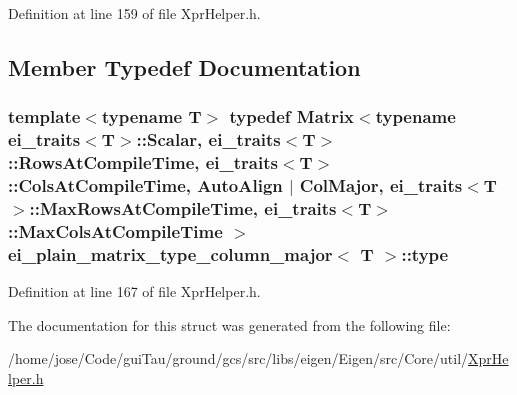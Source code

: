 Definition at line 159 of file Xpr\-Helper.\-h.



\subsection{Member Typedef Documentation}
\hypertarget{structei__plain__matrix__type__column__major_a038c0b348f1d8849036cbd2bfe8bba6b}{
\subsubsection[{type}]{\setlength{\rightskip}{0pt plus 5cm}template$<$typename T$>$ typedef {\bf Matrix}$<$typename {\bf ei\-\_\-traits}$<$T$>$\-::Scalar, {\bf ei\-\_\-traits}$<$T$>$\-::Rows\-At\-Compile\-Time, {\bf ei\-\_\-traits}$<$T$>$\-::Cols\-At\-Compile\-Time, {\bf Auto\-Align} $|$ {\bf Col\-Major}, {\bf ei\-\_\-traits}$<$T$>$\-::Max\-Rows\-At\-Compile\-Time, {\bf ei\-\_\-traits}$<$T$>$\-::Max\-Cols\-At\-Compile\-Time $>$ {\bf ei\-\_\-plain\-\_\-matrix\-\_\-type\-\_\-column\-\_\-major}$<$ T $>$\-::{\bf type}}}\label{structei__plain__matrix__type__column__major_a038c0b348f1d8849036cbd2bfe8bba6b}


Definition at line 167 of file Xpr\-Helper.\-h.



The documentation for this struct was generated from the following file\-:\begin{DoxyCompactItemize}
\item 
/home/jose/\-Code/gui\-Tau/ground/gcs/src/libs/eigen/\-Eigen/src/\-Core/util/\hyperlink{_xpr_helper_8h}{Xpr\-Helper.\-h}\end{DoxyCompactItemize}
